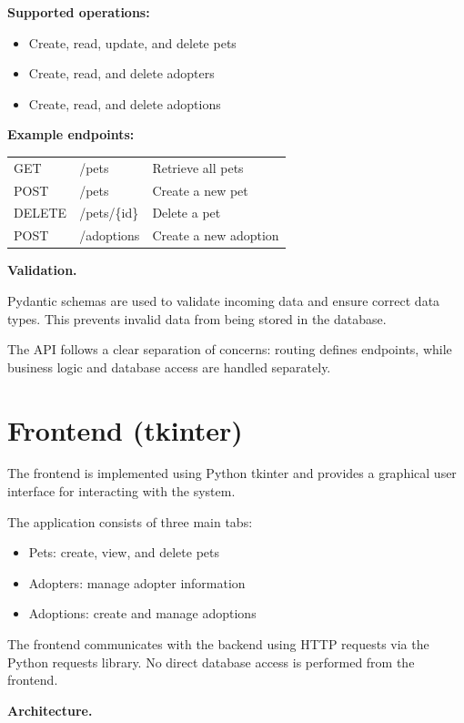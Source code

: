 \documentclass[11pt,a4paper]{article}
\begin{document}
\textbf{Supported operations:}
\begin{itemize}
\item Create, read, update, and delete pets
\item Create, read, and delete adopters
\item Create, read, and delete adoptions
\end{itemize}

\textbf{Example endpoints:}

\begin{tabular}{lll}
GET & /pets & Retrieve all pets \\
POST & /pets & Create a new pet \\
DELETE & /pets/\{id\} & Delete a pet \\
POST & /adoptions & Create a new adoption \\
\end{tabular}

\textbf{Validation.}

Pydantic schemas are used to validate incoming data and ensure correct data types.
This prevents invalid data from being stored in the database.

The API follows a clear separation of concerns: routing defines endpoints, while
business logic and database access are handled separately.

\section{Frontend (tkinter)}


The frontend is implemented using Python tkinter and provides a graphical user
interface for interacting with the system.

The application consists of three main tabs:

\begin{itemize}
\item Pets: create, view, and delete pets
\item Adopters: manage adopter information
\item Adoptions: create and manage adoptions
\end{itemize}

The frontend communicates with the backend using HTTP requests via the Python
requests library. No direct database access is performed from the frontend.

\textbf{Architecture.}
\end{document}
